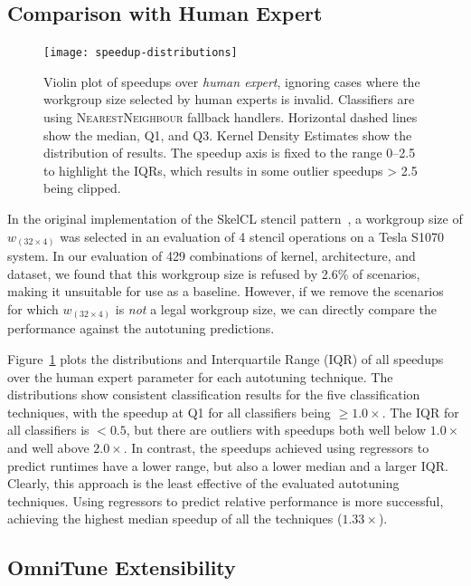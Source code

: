 \subsection{Comparison with Human Expert}

\begin{figure}
\centering
\texttt{[image: speedup-distributions]}
\vspace{-1.2em}
\caption{%
  Violin plot of speedups over \emph{human expert}, ignoring cases
  where the workgroup size selected by human experts is
  invalid. Classifiers are using \textsc{NearestNeighbour} fallback
  handlers. Horizontal dashed lines show the median, Q1, and
  Q3. Kernel Density Estimates show the distribution of results. The
  speedup axis is fixed to the range 0--2.5 to highlight the IQRs,
  which results in some outlier speedups > 2.5 being clipped.%
}
\label{fig:speedup-distributions}
\end{figure}

In the original implementation of the SkelCL stencil
pattern~\cite{Steuwer2014a}, a workgroup size of $w_{(32 \times 4)}$
was selected in an evaluation of 4 stencil operations on a Tesla S1070
system. In our evaluation of 429 combinations of kernel, architecture,
and dataset, we found that this workgroup size is refused by 2.6\% of
scenarios, making it unsuitable for use as a baseline. However, if we
remove the scenarios for which $w_{(32 \times 4)}$ is \emph{not} a
legal workgroup size, we can directly compare the performance against
the autotuning predictions.

Figure~\ref{fig:speedup-distributions} plots the distributions and
Interquartile Range (IQR) of all speedups over the human expert
parameter for each autotuning technique. The distributions show
consistent classification results for the five classification
techniques, with the speedup at Q1 for all classifiers being
$\ge 1.0\times$. The IQR for all classifiers is $< 0.5$, but there are
outliers with speedups both well below $1.0\times$ and well above
$2.0\times$. In contrast, the speedups achieved using regressors to
predict runtimes have a lower range, but also a lower median and a
larger IQR. Clearly, this approach is the least effective of the
evaluated autotuning techniques. Using regressors to predict relative
performance is more successful, achieving the highest median speedup
of all the techniques ($1.33\times$).


\subsection{OmniTune Extensibility}

